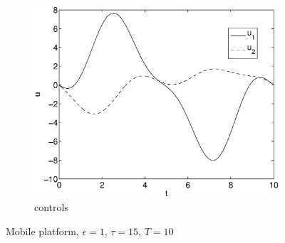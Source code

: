 \begin{figure}[h]
\begin{subfigure}[b]{\textwidth}
\centering
\includegraphics[height=0.3\textheight]{img/final_15_1_10_u.eps}
\caption{controls}
\end{subfigure}
\caption{Mobile platform, $\epsilon=1$, $\tau=15$, $T=10$}
\label{fig:pl1}
\end{figure}

